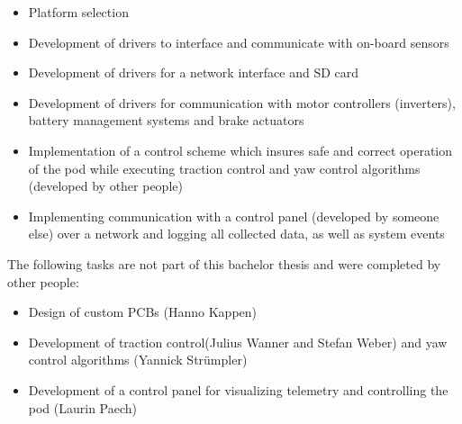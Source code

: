 \begin{itemize}
    \item Platform selection
    \item Development of drivers to interface and communicate with on-board sensors
    \item Development of drivers for a network interface and SD card
    \item Development of drivers for communication with motor controllers (inverters), battery management systems and brake actuators
    \item Implementation of a control scheme which insures safe and correct operation of the pod while executing traction control and yaw control algorithms (developed by other people)
    \item Implementing communication with a control panel (developed by someone else) over a network and logging all collected data, as well as system events
\end{itemize}

The following tasks are not part of this bachelor thesis and were completed by other people:

\begin{itemize}
    \item Design of custom PCBs (Hanno Kappen)
    \item Development of traction control(Julius Wanner and Stefan Weber) and yaw control algorithms (Yannick Strümpler)
    \item Development of a control panel for visualizing telemetry and controlling the pod (Laurin Paech)
\end{itemize}


